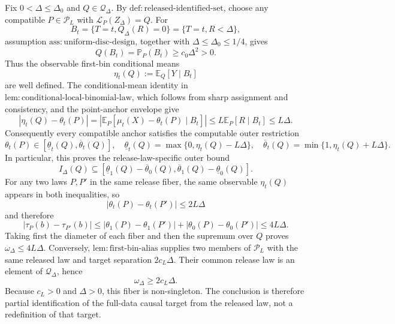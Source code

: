 Fix \(0<\Delta\le\Delta_0\) and \(Q\in\mathcal Q_\Delta\).  By \(\mathrm{def:released\text{-}identified\text{-}set}\), choose any compatible \(P\in\mathcal P_L\) with \(\mathcal L_P(Z_\Delta)=Q\).  For
\[
 B_t=\{T=t,Q_\Delta(R)=0\}=\{T=t,R<\Delta\},
\]
assumption \(\mathrm{ass:uniform\text{-}disc\text{-}design}\), together with \(\Delta\le\Delta_0\le1/4\), gives
\[
 Q(B_t)=\mathbb P_P(B_t)\ge c_0\Delta^2>0.
\]
Thus the observable first-bin conditional means
\[
 \eta_t(Q):=\mathbb E_Q[Y\mid B_t]
\]
are well defined.  The conditional-mean identity in \(\mathrm{lem:conditional\text{-}local\text{-}binomial\text{-}law}\), which follows from sharp assignment and consistency, and the point-anchor envelope give
\[
 |\eta_t(Q)-\theta_t(P)|
 =\left|\mathbb E_P[\mu_t(X)-\theta_t(P)\mid B_t]\right|
 \le L\mathbb E_P[R\mid B_t]
 \le L\Delta.
\]
Consequently every compatible anchor satisfies the computable outer restriction
\[
 \theta_t(P)\in[\underline\theta_t(Q),\overline\theta_t(Q)],
 \quad
 \underline\theta_t(Q)=\max\{0,\eta_t(Q)-L\Delta\},
 \quad
 \overline\theta_t(Q)=\min\{1,\eta_t(Q)+L\Delta\}.
\]
In particular, this proves the release-law-specific outer bound
\[
 I_\Delta(Q)\subseteq
 [\underline\theta_1(Q)-\overline\theta_0(Q),
   \overline\theta_1(Q)-\underline\theta_0(Q)].
\]
For any two laws \(P,P'\) in the same release fiber, the same observable \(\eta_t(Q)\) appears in both inequalities, so
\[
 |\theta_t(P)-\theta_t(P')|\le2L\Delta
\]
and therefore
\[
 |\tau_P(b)-\tau_{P'}(b)|
 \le |\theta_1(P)-\theta_1(P')|+|\theta_0(P)-\theta_0(P')|
 \le4L\Delta.
\]
Taking first the diameter of each fiber and then the supremum over \(Q\) proves \(\omega_\Delta\le4L\Delta\).  Conversely, \(\mathrm{lem:first\text{-}bin\text{-}alias}\) supplies two members of \(\mathcal P_L\) with the same released law and target separation \(2c_L\Delta\).  Their common release law is an element of \(\mathcal Q_\Delta\), hence
\[
 \omega_\Delta\ge2c_L\Delta.
\]
Because \(c_L>0\) and \(\Delta>0\), this fiber is non-singleton.  The conclusion is therefore partial identification of the full-data causal target from the released law, not a redefinition of that target.